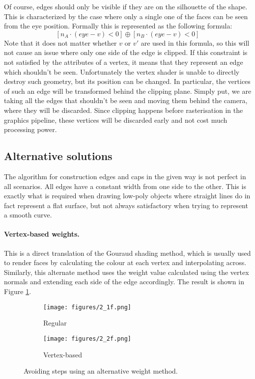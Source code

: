 \documentclass[a4paper,10pt]{article}
\begin{document}
Of course, edges should only be visible if they are on the silhouette of the shape. This is characterized by the case where only a single one of the faces can be seen from the eye position. Formally this is represented as the following formula:
$$[n_A \cdot (eye-v) < 0] \oplus [n_B \cdot (eye-v) < 0]$$
Note that it does not matter whether $v$ or $v'$ are used in this formula, so this will not cause an issue where only one side of the edge is clipped. If this constraint is not satisfied by the attributes of a vertex, it means that they represent an edge which shouldn't be seen. Unfortunately the vertex shader is unable to directly destroy such geometry, but its position can be changed. In particular, the vertices of such an edge will be transformed behind the clipping plane. Simply put, we are taking all the edges that shouldn't be seen and moving them behind the camera, where they will be discarded. Since clipping happens before rasterisation in the graphics pipeline, these vertices will be discarded early and not cost much processing power.


\subsection{Alternative solutions}
The algorithm for construction edges and caps in the given way is not perfect in all scenarios. All edges have a constant width from one side to the other. This is exactly what is required when drawing low-poly objects where straight lines do in fact represent a flat surface, but not always satisfactory when trying to represent a smooth curve.

\paragraph{Vertex-based weights.}
This is a direct translation of the Gouraud shading method, which is usually used to render faces by calculating the colour at each vertex and interpolating across. Similarly, this alternate method uses the weight value calculated using the vertex normals and extending each side of the edge accordingly. The result is shown in Figure \ref{smooth}.

\begin{figure}[htbp!]
  \centering
  \begin{subfigure}{0.25\columnwidth}
    \texttt{[image: figures/2\_1f.png]}
    \caption{Regular}
  \end{subfigure}
  \begin{subfigure}{0.25\columnwidth}
    \texttt{[image: figures/2\_2f.png]}
    \caption{Vertex-based}
  \end{subfigure}
  \caption{Avoiding steps using an alternative weight method.}
  \label{smooth}
\end{figure}
\end{document}

